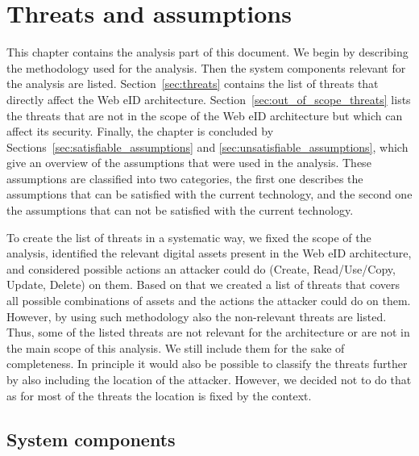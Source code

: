 \chapter{Threats and assumptions}

This chapter contains the analysis part of this document. We begin by describing the methodology used for the analysis. Then the system components relevant for the analysis are listed. Section~\ref{sec:threats} contains the list of threats that directly affect the Web eID architecture. Section~\ref{sec:out_of_scope_threats} lists the threats that are not in the scope of the Web eID architecture but which can affect its security. Finally, the chapter is concluded by Sections~\ref{sec:satisfiable_assumptions} and \ref{sec:unsatisfiable_assumptions}, which give an overview of the assumptions that were used in the analysis. These assumptions are classified into two categories, the first one describes the assumptions that can be satisfied with the current technology, and the second one the assumptions that can not be satisfied with the current technology.

To create the list of threats in a systematic way, we fixed the scope of the analysis, identified the relevant digital assets present in the Web eID architecture, and considered possible actions an attacker could do (Create, Read/Use/Copy, Update, Delete) on them. Based on that we created a list of threats that covers all possible combinations of assets and the actions the attacker could do on them. However, by using such methodology also the non-relevant threats are listed. Thus, some of the listed threats are not relevant for the architecture or are not in the main scope of this analysis. We still include them for the sake of completeness. In principle it would also be possible to classify the threats further by also including the location of the attacker. However, we decided not to do that as for most of the threats the location is fixed by the context. 


\section{System components}

